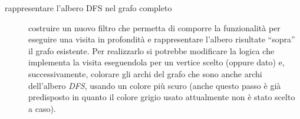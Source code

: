 \begin{description}
\item[rappresentare l'albero DFS nel grafo completo] costruire un
  nuovo filtro che permetta di comporre la funzionalit\`a per eseguire
  una visita in profondit\`a e rappresentare l'albero risultate
  ``sopra'' il grafo esistente. Per realizzarlo si potrebbe modificare
  la logica che implementa la visita eseguendola per un vertice scelto
  (oppure dato) e, successivamente, colorare gli archi del grafo che
  sono anche archi dell'albero \emph{DFS}, usando un colore pi\`u
  scuro (anche questo passo \`e gi\`a predisposto in quanto il colore
  grigio usato attualmente non \`e stato scelto a caso).


\end{description}
